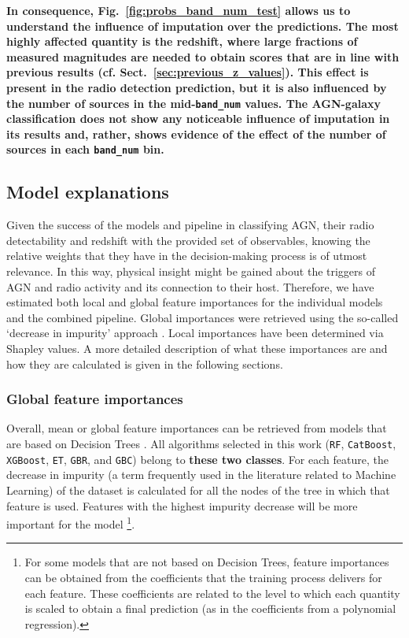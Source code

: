 \documentclass{aa}
\begin{document}
\textbf{In consequence, Fig.~\ref{fig:probs_band_num_test} allows us to understand the influence of imputation over the predictions. The most highly affected quantity is the redshift, where large fractions of measured magnitudes are needed to obtain scores that are in line with previous results (cf. Sect.~\ref{sec:previous_z_values}). This effect is present in the radio detection prediction, but it is also influenced by the number of sources in the mid-\texttt{band\_num} values. The AGN-galaxy classification does not show any noticeable influence of imputation in its results and, rather, shows evidence of the effect of the number of sources in each \texttt{band\_num} bin.}

\subsection{Model explanations}\label{sec:model_explain}

Given the success of the models and pipeline in classifying AGN, their radio detectability and redshift with the provided set of observables, knowing the relative weights that they have in the decision-making process is of utmost relevance. In this way, physical insight might be gained about the triggers of AGN and radio activity and its connection to their host.
Therefore, we have estimated both local and global feature importances for the individual models and the combined pipeline. Global importances were retrieved using the so-called `decrease in impurity' approach \citep[see, for example,][]{Breiman2001}. Local importances have been determined via Shapley values. A more detailed description of what these importances are and how they are calculated is given in the following sections.

\subsubsection{Global feature importances}\label{sec:feat_importances}

Overall, mean or global feature importances can be retrieved from models that are based on Decision Trees \citep[e.g. Random Forests and Boosting models,][]{Breiman2001, breiman2003manual}. All algorithms selected in this work (\verb|RF|, \verb|CatBoost|, \verb|XGBoost|, \verb|ET|, \verb|GBR|, and \verb|GBC|) belong to \textbf{these two classes}. For each feature, the decrease in impurity (a term frequently used in the literature related to Machine Learning) of the dataset is calculated for all the nodes of the tree in which that feature is used. Features with the highest impurity decrease will be more important for the model \citep{NIPS2013_e3796ae8}\footnote{For some models that are not based on Decision Trees, feature importances can be obtained from the coefficients that the training process delivers for each feature. These coefficients are related to the level to which each quantity is scaled to obtain a final prediction (as in the coefficients from a polynomial regression).}.
\end{document}
